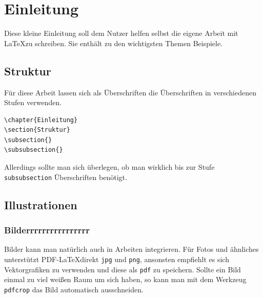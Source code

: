 \chapter{Einleitung}

Diese kleine Einleitung soll dem Nutzer helfen selbst die eigene Arbeit mit \LaTeX zu schreiben. Sie enthält zu den wichtigsten Themen Beispiele.


\section{Struktur}

Für diese Arbeit lassen sich als Überschriften die Überschriften in verschiedenen Stufen verwenden.

\begin{verbatim}
\chapter{Einleitung}
\section{Struktur}
\subsection{}
\subsubsection{}
\end{verbatim}

Allerdings sollte man sich überlegen, ob man wirklich bis zur Stufe \verb|subsubsection| Überschriften benötigt.



\section{Illustrationen}


\subsection{Bilderrrrrrrrrrrrrrrr}

Bilder kann man natürlich auch in Arbeiten integrieren. Für Fotos und ähnliches unterstützt PDF-\LaTeX direkt \verb|jpg| und \verb|png|, ansonsten empfiehlt es sich Vektorgrafiken zu verwenden und diese als \verb|pdf| zu speichern. Sollte ein Bild einmal zu viel weißen Raum um sich haben, so kann man mit dem Werkzeug \verb|pdfcrop| das Bild automatisch ausschneiden\cite{pdfcrop}.

